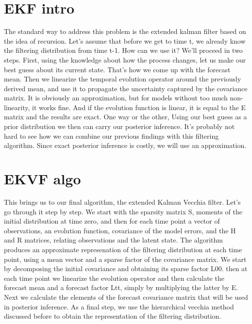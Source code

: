 \documentclass[14pt]{extarticle} %
\begin{document}
\newpage
\section*{EKF intro}




The standard way to address this problem is the extended kalman filter based on the idea of recursion. Let's assume that before we get to time t, we already know the filtering distribution from time t-1. How can we use it?
We'll proceed in two steps. First, using the knowledge about how the process changes, let us make our best guess about its current state. That's how we come up with the forecast mean. Then we linearize the temporal evolution operator around the previously derived mean, and use it to propagate the uncertainty captured by the covariance matrix. It is obviously an approximation, but for models without too much non-linearity, it works fine. And if the evolution function is linear, it is equal to the E matrix and the results are exact. One way or the other, Using our best guess as a prior distribution we then can carry our posterior inference. It's probably not hard to see how we can combine our previous findings with this filtering algorithm. Since exact posterior inference is costly, we will use an approximation.


\newpage
\section*{EKVF algo}


This brings us to our final algorithm, the extended Kalman Vecchia filter. Let's go through it step by step. We start with the sparsity matrix S, moments of the initial distribution at time zero, and then for each time point a vector of observations, an evolution function, covariance of the model errors, and the H and R matrices, relating observations and the latent state. The algorithm produces an approximate represenation of the filtering distribution at each time point, using a mean vector and a sparse factor of the covariance matrix. We start by decomposing the initial covariance and obtaining its sparse factor L00. then at each time point we linearize the evolution operator and then calculate the forecast mean and a forecast factor Ltt, simply by multiplying the latter by E. Next we calculate the elements of the forecast covariance matrix that will be used in posterior inference. As a final step, we use the hierarchical vecchia method discussed before to obtain the representation of the filtering distribution.
\end{document}
